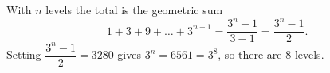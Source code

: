 With $n$ levels the total is the geometric sum
\[
1+3+9+\dots+3^{n-1}=\dfrac{3^n-1}{3-1}=\dfrac{3^n-1}{2}.
\]
Setting $\dfrac{3^n-1}{2}=3280$ gives $3^n=6561=3^8$, so there are $\boxed{8}$ levels.
